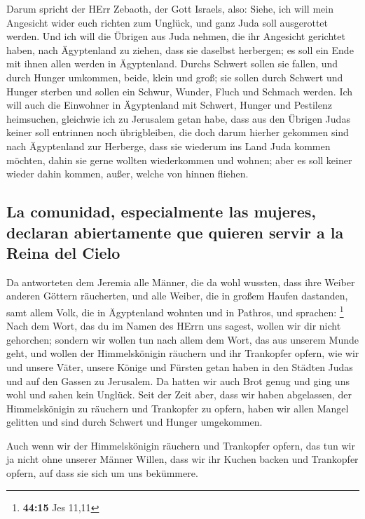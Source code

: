  Darum spricht der HErr Zebaoth, der Gott Israels, also:
Siehe, ich will mein Angesicht wider euch richten zum Unglück, und ganz
Juda soll ausgerottet werden.  Und ich will die Übrigen
aus Juda nehmen, die ihr Angesicht gerichtet haben, nach Ägyptenland zu
ziehen, dass sie daselbst herbergen; es soll ein Ende mit ihnen allen
werden in Ägyptenland. Durchs Schwert sollen sie fallen, und durch
Hunger umkommen, beide, klein und groß; sie sollen durch Schwert und
Hunger sterben und sollen ein Schwur, Wunder, Fluch und Schmach werden.
 Ich will auch die Einwohner in Ägyptenland mit Schwert,
Hunger und Pestilenz heimsuchen, gleichwie ich zu Jerusalem getan habe,
 dass aus den Übrigen Judas keiner soll entrinnen noch
übrigbleiben, die doch darum hierher gekommen sind nach Ägyptenland zur
Herberge, dass sie wiederum ins Land Juda kommen möchten, dahin sie
gerne wollten wiederkommen und wohnen; aber es soll keiner wieder dahin
kommen, außer, welche von hinnen fliehen.

\hypertarget{la-comunidad-especialmente-las-mujeres-declaran-abiertamente-que-quieren-servir-a-la-reina-del-cielo}{%
\subsection{La comunidad, especialmente las mujeres, declaran
abiertamente que quieren servir a la Reina del
Cielo}\label{la-comunidad-especialmente-las-mujeres-declaran-abiertamente-que-quieren-servir-a-la-reina-del-cielo}}

 Da antworteten dem Jeremia alle Männer, die da wohl
wussten, dass ihre Weiber anderen Göttern räucherten, und alle Weiber,
die in großem Haufen dastanden, samt allem Volk, die in Ägyptenland
wohnten und in Pathros, und sprachen: \footnote{\textbf{44:15} Jes 11,11}
 Nach dem Wort, das du im Namen des HErrn uns sagest,
wollen wir dir nicht gehorchen;  sondern wir wollen tun
nach allem dem Wort, das aus unserem Munde geht, und wollen der
Himmelskönigin räuchern und ihr Trankopfer opfern, wie wir und unsere
Väter, unsere Könige und Fürsten getan haben in den Städten Judas und
auf den Gassen zu Jerusalem. Da hatten wir auch Brot genug und ging uns
wohl und sahen kein Unglück.  Seit der Zeit aber, dass
wir haben abgelassen, der Himmelskönigin zu räuchern und Trankopfer zu
opfern, haben wir allen Mangel gelitten und sind durch Schwert und
Hunger umgekommen.

 Auch wenn wir der Himmelskönigin räuchern und Trankopfer
opfern, das tun wir ja nicht ohne unserer Männer Willen, dass wir ihr
Kuchen backen und Trankopfer opfern, auf dass sie sich um uns bekümmere.

